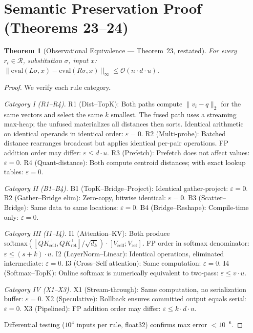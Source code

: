 \documentclass{article}
\newtheorem{theorem}{Theorem}
\theoremstyle{definition}
\theoremstyle{remark}
\newcommand{\BigO}{\mathcal{O}}
\begin{document}
\section{Semantic Preservation Proof (Theorems 23--24)}\label{app:semantic-proof}

\begin{theorem}[Observational Equivalence --- Theorem~23, restated]\label{thm:obs-equiv-app}
For every $r_i \in \mathcal{R}$, substitution $\sigma$, input $x$:
$\|\mathrm{eval}(L\sigma,x) - \mathrm{eval}(R\sigma,x)\|_\infty \leq \BigO(n \cdot d \cdot u)$.
\end{theorem}

\begin{proof}
We verify each rule category.

\emph{Category I (R1--R4).}
R1 (Dist--TopK): Both paths compute $\|v_i - q\|_2$ for the same vectors and select the same $k$ smallest. The fused path uses a streaming max-heap; the unfused materializes all distances then sorts. Identical arithmetic on identical operands in identical order: $\varepsilon = 0$.
R2 (Multi-probe): Batched distance rearranges broadcast but applies identical per-pair operations. FP addition order may differ: $\varepsilon \leq d \cdot u$.
R3 (Prefetch): Prefetch does not affect values: $\varepsilon = 0$.
R4 (Quant-distance): Both compute centroid distances; with exact lookup tables: $\varepsilon = 0$.

\emph{Category II (B1--B4).}
B1 (TopK--Bridge--Project): Identical gather-project: $\varepsilon = 0$.
B2 (Gather--Bridge elim): Zero-copy, bitwise identical: $\varepsilon = 0$.
B3 (Scatter--Bridge): Same data to same locations: $\varepsilon = 0$.
B4 (Bridge--Reshape): Compile-time only: $\varepsilon = 0$.

\emph{Category III (I1--I4).}
I1 (Attention--KV): Both produce $\mathrm{softmax}([QK_{\text{self}}^\top, QK_{\text{ret}}^\top]/\sqrt{d_k}) \cdot [V_{\text{self}};V_{\text{ret}}]$. FP order in softmax denominator: $\varepsilon \leq (s+k) \cdot u$.
I2 (LayerNorm--Linear): Identical operations, eliminated intermediate: $\varepsilon = 0$.
I3 (Cross--Self attention): Same computation: $\varepsilon = 0$.
I4 (Softmax--TopK): Online softmax is numerically equivalent to two-pass: $\varepsilon \leq v \cdot u$.

\emph{Category IV (X1--X3).}
X1 (Stream-through): Same computation, no serialization buffer: $\varepsilon = 0$.
X2 (Speculative): Rollback ensures committed output equals serial: $\varepsilon = 0$.
X3 (Pipelined): FP addition order may differ: $\varepsilon \leq k \cdot d \cdot u$.

Differential testing ($10^4$ inputs per rule, float32) confirms max error $< 10^{-6}$.
\end{proof}
\end{document}
